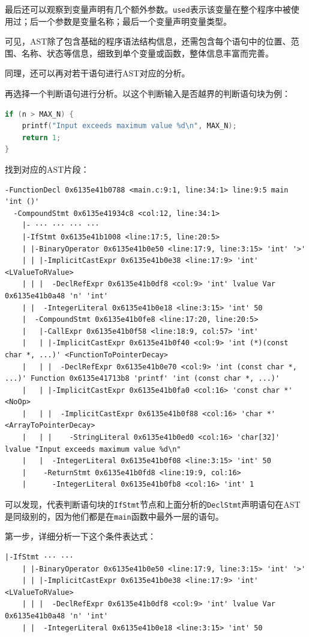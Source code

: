 \documentclass[UTF8,a4paper,10pt]{ctexart}
\begin{document}
最后还可以观察到变量声明有几个额外参数。\texttt{used}表示该变量在整个程序中被使用过；后一个参数是变量名称；最后一个变量声明变量类型。

可见，AST除了包含基础的程序语法结构信息，还需包含每个语句中的位置、范围、名称、状态等信息，细致到单个变量或函数，整体信息丰富而完善。

\vspace{1em}

同理，还可以再对若干语句进行AST对应的分析。

再选择一个判断语句进行分析。以这个判断输入是否越界的判断语句块为例：
\begin{lstlisting}[frame=trbl,language={C++}]
if (n > MAX_N) {
    printf("Input exceeds maximum value %d\n", MAX_N);
    return 1;
}
\end{lstlisting}
找到对应的AST片段：
\begin{lstlisting}[title=AST片段 2,frame=trbl]
-FunctionDecl 0x6135e41b0788 <main.c:9:1, line:34:1> line:9:5 main 'int ()'
  -CompoundStmt 0x6135e41934c8 <col:12, line:34:1>
    |- ··· ··· ··· ···
    |-IfStmt 0x6135e41b1008 <line:17:5, line:20:5>
    | |-BinaryOperator 0x6135e41b0e50 <line:17:9, line:3:15> 'int' '>'
    | | |-ImplicitCastExpr 0x6135e41b0e38 <line:17:9> 'int' <LValueToRValue>
    | | |  -DeclRefExpr 0x6135e41b0df8 <col:9> 'int' lvalue Var 0x6135e41b0a48 'n' 'int'
    | |  -IntegerLiteral 0x6135e41b0e18 <line:3:15> 'int' 50
    |  -CompoundStmt 0x6135e41b0fe8 <line:17:20, line:20:5>
    |   |-CallExpr 0x6135e41b0f58 <line:18:9, col:57> 'int'
    |   | |-ImplicitCastExpr 0x6135e41b0f40 <col:9> 'int (*)(const char *, ...)' <FunctionToPointerDecay>
    |   | |  -DeclRefExpr 0x6135e41b0e70 <col:9> 'int (const char *, ...)' Function 0x6135e41713b8 'printf' 'int (const char *, ...)'
    |   | |-ImplicitCastExpr 0x6135e41b0fa0 <col:16> 'const char *' <NoOp>
    |   | |  -ImplicitCastExpr 0x6135e41b0f88 <col:16> 'char *' <ArrayToPointerDecay>
    |   | |    -StringLiteral 0x6135e41b0ed0 <col:16> 'char[32]' lvalue "Input exceeds maximum value %d\n"
    |   |  -IntegerLiteral 0x6135e41b0f08 <line:3:15> 'int' 50
    |    -ReturnStmt 0x6135e41b0fd8 <line:19:9, col:16>
    |      -IntegerLiteral 0x6135e41b0fb8 <col:16> 'int' 1
\end{lstlisting}

可以发现，代表判断语句块的\texttt{IfStmt}节点和上面分析的\texttt{DeclStmt}声明语句在AST是同级别的，因为他们都是在\texttt{main}函数中最外一层的语句。

第一步，详细分析一下这个条件表达式：
\begin{lstlisting}[frame=trbl]
    |-IfStmt ··· ···
    | |-BinaryOperator 0x6135e41b0e50 <line:17:9, line:3:15> 'int' '>'
    | | |-ImplicitCastExpr 0x6135e41b0e38 <line:17:9> 'int' <LValueToRValue>
    | | |  -DeclRefExpr 0x6135e41b0df8 <col:9> 'int' lvalue Var 0x6135e41b0a48 'n' 'int'
    | |  -IntegerLiteral 0x6135e41b0e18 <line:3:15> 'int' 50
\end{lstlisting}
\end{document}
